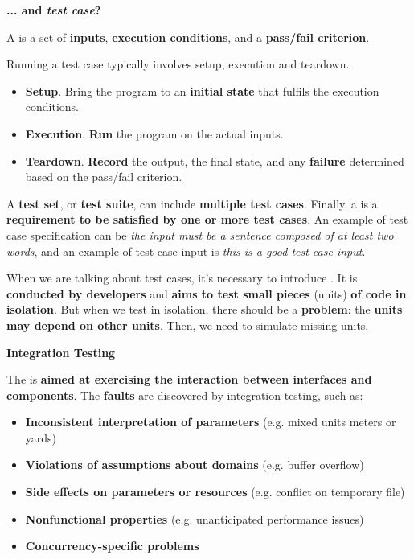 \begin{flushleft}
    \textcolor{Green3}{ \textbf{... and \emph{test case}?}}
\end{flushleft}
\begin{definitionbox}
    A  is a set of \textbf{inputs}, \textbf{execution conditions}, and a \textbf{pass/fail criterion}.
\end{definitionbox}

\noindent
Running a test case typically involves setup, execution and teardown.
\begin{itemize}
    \item \textbf{Setup}. Bring the program to an \textbf{initial state} that fulfils the execution conditions.
    
    \item \textbf{Execution}. \textbf{Run} the program on the actual inputs.
    
    \item \textbf{Teardown}. \textbf{Record} the output, the final state, and any \textbf{failure} determined based on the pass/fail criterion.
\end{itemize}
A \textbf{test set}, or \textbf{test suite}, can include \textbf{multiple test cases}. Finally, a  is a \textbf{requirement to be satisfied by one or more test cases}. An example of test case specification can be \emph{the input must be a sentence composed of at least two words}, and an example of test case input is \emph{this is a good test case input}.

\highspace
When we are talking about test cases, it's necessary to introduce . It is \textbf{conducted by developers} and \textbf{aims to test small pieces} (units) \textbf{of code in isolation}. But when we test in isolation, there should be a \textbf{problem}: the \textbf{units may depend on other units}. Then, we need to simulate missing units.

\begin{flushleft}
    \textcolor{Red2}{\textbf{Integration Testing}}
\end{flushleft}
The  is \textbf{aimed at exercising the interaction between interfaces and components}. The \textbf{faults} are discovered by integration testing, such as:
\begin{itemize}
    \item \textbf{Inconsistent interpretation of parameters} (e.g. mixed units meters or yards)

    \item \textbf{Violations of assumptions about domains} (e.g. buffer overflow)

    \item \textbf{Side effects on parameters or resources} (e.g. conflict on temporary file)

    \item \textbf{Nonfunctional properties} (e.g. unanticipated performance issues)

    \item \textbf{Concurrency-specific problems}
\end{itemize}
